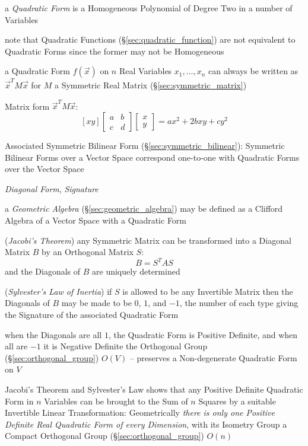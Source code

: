 a \emph{Quadratic Form} is a Homogeneous Polynomial of Degree Two in a number of
Variables

note that Quadratic Functions (\S\ref{sec:quadratic_function}) are not
equivalent to Quadratic Forms since the former may not be Homogeneous

a Quadratic Form $f(\vec{x})$ on $n$ Real Variables $x_1,\ldots,x_n$ can always
be written as $\vec{x}^T M \vec{x}$ for $M$ a Symmetric Real Matrix
(\S\ref{sec:symmetric_matrix})

Matrix form $\vec{x}^T M \vec{x}$:
\[
  [x y]
  \begin{bmatrix}
    a & b \\
    c & d
  \end{bmatrix}
  \begin{bmatrix}
    x \\
    y
  \end{bmatrix}
  = ax^2 + 2bxy + cy^2
\]

Associated Symmetric Bilinear Form (\S\ref{sec:symmetric_bilinear}): Symmetric
Bilinear Forms over a Vector Space correspond one-to-one with Quadratic Forms
over the Vector Space

\emph{Diagonal Form}, \emph{Signature}

\fist a \emph{Geometric Algebra} (\S\ref{sec:geometric_algebra}) may be defined
as a Clifford Algebra of a Vector Space with a Quadratic Form

(\emph{Jacobi's Theorem}) any Symmetric Matrix can be transformed into a
Diagonal Matrix $B$ by an Orthogonal Matrix $S$:
\[
  B = S^T A S
\]
and the Diagonals of $B$ are uniquely determined

(\emph{Sylvester's Law of Inertia}) if $S$ is allowed to be any Invertible
Matrix then the Diagonals of $B$ may be made to be $0$, $1$, and $-1$, the
number of each type giving the Signature of the associated Quadratic Form

when the Diagonals are all $1$, the Quadratic Form is Positive Definite, and
when all are $-1$ it is Negative Definite
the Orthogonal Group (\S\ref{sec:orthogonal_group}) $O(V)$ -- preserves a
Non-degenerate Quadratic Form on $V$

Jacobi's Theorem and Sylvester's Law shows that any Positive Definite Quadratic
Form in $n$ Variables can be brought to the Sum of $n$ Squares by a suitable
Invertible Linear Transformation: Geometrically \emph{there is only one
  Positive Definite Real Quadratic Form of every Dimension}, with its Isometry
Group a Compact Orthogonal Group (\S\ref{sec:orthogonal_group}) $O(n)$


